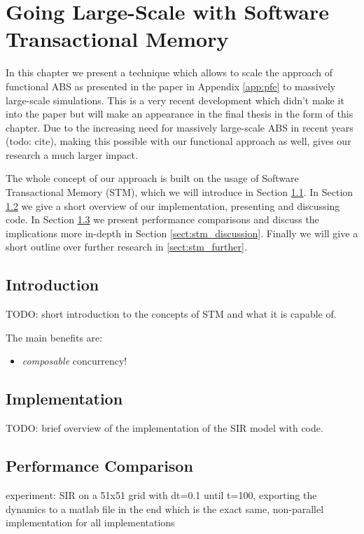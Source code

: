 \chapter{Going Large-Scale with Software Transactional Memory}
\label{chap:stm}

In this chapter we present a technique which allows to scale the approach of functional ABS as presented in the paper in Appendix \ref{app:pfe} to massively large-scale simulations. This is a very recent development which didn't make it into the paper but will make an appearance in the final thesis in the form of this chapter. Due to the increasing need for massively large-scale ABS in recent years (todo: cite), making this possible with our functional approach as well, gives our research a much larger impact.

The whole concept of our approach is built on the usage of Software Transactional Memory (STM), which we will introduce in Section \ref{sect:stm_intro}. In Section \ref{sect:stm_impl} we give a short overview of our implementation, presenting and discussing code. In Section \ref{sect:stm_perf} we present performance comparisons and discuss the implications more in-depth in Section \ref{sect:stm_discussion}. Finally we will give a short outline over further research in \ref{sect:stm_further}.

\section{Introduction}
\label{sect:stm_intro}
TODO: short introduction to the concepts of STM and what it is capable of.

The main benefits are:
\begin{itemize}
	\item \textit{composable} concurrency!
\end{itemize}

\section{Implementation}
\label{sect:stm_impl}
TODO: brief overview of the implementation of the SIR model with code.

\section{Performance Comparison}
\label{sect:stm_perf}
experiment: SIR on a 51x51 grid with dt=0.1 until t=100, exporting the dynamics to a matlab file in the end which is the exact same, non-parallel implementation for all implementations 

